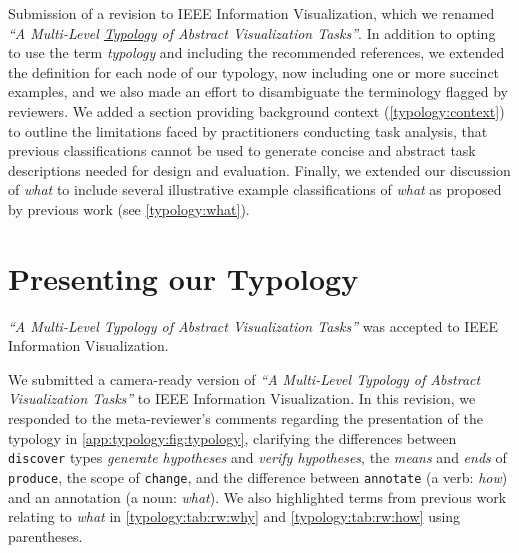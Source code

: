 Submission of a revision to IEEE Information Visualization, which we renamed {\it``A Multi-Level \underline{Typology} of Abstract Visualization Tasks''}.
In addition to opting to use the term {\it typology} and including the recommended references, we extended the definition for each node of our typology, now including one or more succinct examples, and we also made an effort to disambiguate the terminology flagged by reviewers. 
We added a section providing background context (\autoref{typology:context}) to outline the limitations faced by practitioners conducting task analysis, that previous classifications cannot be used to generate concise and abstract task descriptions needed for design and evaluation. 
Finally, we extended our discussion of {\it what} to include several illustrative example classifications of {\it what} as proposed by previous work (see \autoref{typology:what}).


\section{Presenting our Typology}
\label{app:typology:chronology:presentation}


{\it``A Multi-Level Typology of Abstract Visualization Tasks''} was accepted to IEEE Information Visualization.

We submitted a camera-ready version of {\it``A Multi-Level Typology of Abstract Visualization Tasks''} to IEEE Information Visualization.
In this revision, we responded to the meta-reviewer's comments regarding the presentation of the typology in \autoref{app:typology:fig:typology}, clarifying the differences between {\tt discover} types {\it generate hypotheses} and {\it verify hypotheses}, the {\it means} and {\it ends} of {\tt produce}, the scope of {\tt change}, and the difference between {\tt annotate} (a verb: {\it how}) and an annotation (a noun: {\it what}).
We also highlighted terms from previous work relating to {\it what} in \autoref{typology:tab:rw:why} and \autoref{typology:tab:rw:how} using parentheses.



